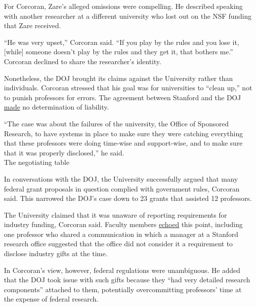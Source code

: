 \documentclass{article}%
\begin{document}
\par{For Corcoran, Zare’s alleged omissions were compelling. He described speaking with another researcher at a different university who lost out on the NSF funding that Zare received. }\\
\par{“He was very upset,” Corcoran said. “If you play by the rules and you lose it, [while] someone doesn’t play by the rules and they get it, that bothers me.” Corcoran declined to share the researcher’s identity.}\\
\par{Nonetheless, the DOJ brought its claims against the University rather than individuals. Corcoran stressed that his goal was for universities to “clean up,” not to punish professors for errors. The agreement between Stanford and the DOJ \href{https://www.justice.gov/opa/pr/stanford-university-agrees-pay-19-million-resolve-allegations-it-failed-disclose-foreign}{made} no determination of liability.}\\
\par{“The case was about the failures of the university, the Office of Sponsored Research, to have systems in place to make sure they were catching everything that these professors were doing time-wise and support-wise, and to make sure that it was properly disclosed,” he said.}\\
The negotiating table
\par{In conversations with the DOJ, the University successfully argued that many federal grant proposals in question complied with government rules, Corcoran said. This narrowed the DOJ’s case down to 23 grants that assisted 12 professors.}\\
\par{The University claimed that it was unaware of reporting requirements for industry funding, Corcoran said. Faculty members \href{https://stanforddaily.com/2023/10/27/professors-raise-questions-over-1-9-million-stanford-doj-settlement/}{echoed} this point, including one professor who shared a communication in which a manager at a Stanford research office suggested that the office did not consider it a requirement to disclose industry gifts at the time.}\\
\par{In Corcoran’s view, however, federal regulations were unambiguous. He added that the DOJ took issue with such gifts because they “had very detailed research components” attached to them, potentially overcommitting professors’ time at the expense of federal research.}\\
\end{document}

